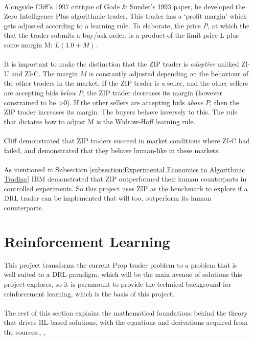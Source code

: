 \documentclass[ %
                    author={Ashwinder Khurana},
                supervisor={Prof Dave Cliff},
                    degree={MEng},
                     title={The Deeply Reinforced Trader},
                  subtitle={},
                      type={enterprise},
                      year={2020} ]{dissertation}
\begin{document}
\\
Alongside Cliff's 1997 critique of Gode \& Sunder's 1993 paper, he developed the Zero Intelligence Plus algorithmic trader. This trader has a \enquote*{profit margin} which gets adjusted according to a learning rule. To elaborate, the price \textit{P}, at which the that the trader submits a buy/ask order, is a product of the limit price L plus some margin M: $L(1.0 + M)$. 
\\
\\
\noindent
It is important to make the distinction that the ZIP trader is \textit{adaptive} unliked ZI-U and ZI-C. The margin $M$ is constantly adjusted depending on the behaviour of the other traders in the market. If the ZIP trader is a seller, and the other sellers are accepting bids \textit{below} $P$, the ZIP trader decreases its margin (however constrained to be \textgreater 0). If the other sellers are accepting bids \textit{above} $P$, then the ZIP trader increases its margin. The buyers behave inversely to this. The rule that dictates how to adjust M is the Widrow-Hoff learning rule.
\\
\\
Cliff demonstrated that ZIP traders succeed in market conditions where ZI-C had failed, and demonstrated that they behave human-like in these markets.   
\\
\\
As mentioned in Subsection \ref{subsection:Experimental Economics to Algorithmic Trading} IBM demonstrated that ZIP outperformed their human counterparts in controlled experiments. So this project uses ZIP as the benchmark to explore if a DRL trader can be implemented that will too, outperform its human counterparts.  

\section{Reinforcement Learning}

This project transforms the current Prop trader problem to a problem that is well suited to a DRL paradigm, which will be the main avenue of solutions this project explores, so it is paramount to provide the technical background for reinforcement learning, which is the basis of this project.
\\
\\
The rest of this section explains the mathematical foundations behind the theory that drives RL-based solutions, with the equations and derivations acquired from the sources:\cite{https://towardsdatascience.com/reinforcement-learning-demystified-markov-decision-processes-part-1-bf00dda41690}, \cite{rearrange-value-function https://www.jeremyjordan.me/markov-decision-process}, \cite{https://www.davidsilver.uk/teaching/}
\end{document}
